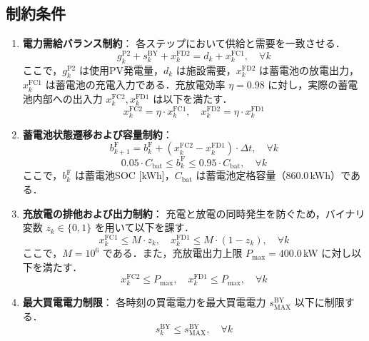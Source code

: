 \documentclass[a4paper,11pt,dvipdfmx]{jsarticle}
\begin{document}
\subsection{制約条件}
\begin{enumerate}
    \item \textbf{電力需給バランス制約}：
          各ステップにおいて供給と需要を一致させる．
          \begin{equation}
              g^{\mathrm{P2}}_{k} + s^{\mathrm{BY}}_{k} + x^{\mathrm{FD2}}_{k} = d_{k} + x^{\mathrm{FC1}}_{k}, \quad \forall k
          \end{equation}
          ここで，$g^{\mathrm{P2}}_{k}$ は使用PV発電量，$d_{k}$ は施設需要，$x^{\mathrm{FD2}}_{k}$ は蓄電池の放電出力，$x^{\mathrm{FC1}}_{k}$ は蓄電池の充電入力である．充放電効率 $\eta = 0.98$ に対し，実際の蓄電池内部への出入力 $x^{\mathrm{FC2}}_{k}, x^{\mathrm{FD1}}_{k}$ は以下を満たす．
          \begin{equation}
              x^{\mathrm{FC2}}_{k} = \eta \cdot x^{\mathrm{FC1}}_{k}, \quad x^{\mathrm{FD2}}_{k} = \eta \cdot x^{\mathrm{FD1}}_{k}
          \end{equation}

    \item \textbf{蓄電池状態遷移および容量制約}：
          \begin{equation}
              b^{\mathrm{F}}_{k+1} = b^{\mathrm{F}}_{k} + (x^{\mathrm{FC2}}_{k} - x^{\mathrm{FD1}}_{k}) \cdot \Delta t, \quad \forall k
          \end{equation}
          \begin{equation}
              0.05 \cdot C_{\mathrm{bat}} \leq b^{\mathrm{F}}_{k} \leq 0.95 \cdot C_{\mathrm{bat}}, \quad \forall k
          \end{equation}
          ここで，$b^{\mathrm{F}}_{k}$ は蓄電池SOC [kWh]，$C_{\mathrm{bat}}$ は蓄電池定格容量（860.0\,kWh）である．

    \item \textbf{充放電の排他および出力制約}：
          充電と放電の同時発生を防ぐため，バイナリ変数 $z_{k} \in \{0, 1\}$ を用いて以下を課す．
          \begin{equation}
              x^{\mathrm{FC1}}_{k} \leq M \cdot z_{k}, \quad x^{\mathrm{FD1}}_{k} \leq M \cdot (1 - z_{k}), \quad \forall k
          \end{equation}
          ここで，$M = 10^6$ である．また，充放電出力上限 $P_{\mathrm{max}} = 400.0$\,kW に対し以下を満たす．
          \begin{equation}
              x^{\mathrm{FC2}}_{k} \leq P_{\mathrm{max}}, \quad x^{\mathrm{FD1}}_{k} \leq P_{\mathrm{max}}, \quad \forall k
          \end{equation}

    \item \textbf{最大買電電力制限}：
          各時刻の買電電力を最大買電電力 $s^{\mathrm{BY}}_{\mathrm{MAX}}$ 以下に制限する．
          \begin{equation}
              s^{\mathrm{BY}}_{k} \leq s^{\mathrm{BY}}_{\mathrm{MAX}}, \quad \forall k
          \end{equation}
\end{enumerate}
\end{document}
